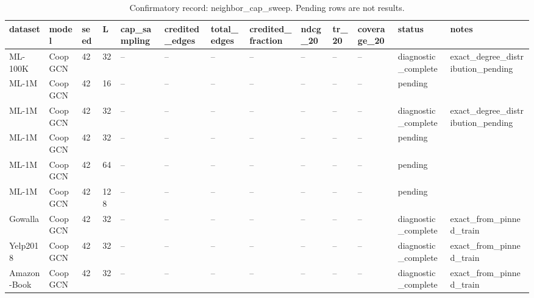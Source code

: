 \begin{table}[t]
\centering
\caption{Confirmatory record: neighbor\_cap\_sweep. Pending rows are not results.}
\begin{tabular}{lllllllllllll}
\toprule
\textbf{dataset} & \textbf{model} & \textbf{seed} & \textbf{L} & \textbf{cap\_sampling} & \textbf{credited\_edges} & \textbf{total\_edges} & \textbf{credited\_fraction} & \textbf{ndcg\_20} & \textbf{tr\_20} & \textbf{coverage\_20} & \textbf{status} & \textbf{notes} \\
\midrule
ML-100K & CoopGCN & 42 & 32 & -- & -- & -- & -- & -- & -- & -- & diagnostic\_complete & exact\_degree\_distribution\_pending \\
ML-1M & CoopGCN & 42 & 16 & -- & -- & -- & -- & -- & -- & -- & pending &  \\
ML-1M & CoopGCN & 42 & 32 & -- & -- & -- & -- & -- & -- & -- & diagnostic\_complete & exact\_degree\_distribution\_pending \\
ML-1M & CoopGCN & 42 & 32 & -- & -- & -- & -- & -- & -- & -- & pending &  \\
ML-1M & CoopGCN & 42 & 64 & -- & -- & -- & -- & -- & -- & -- & pending &  \\
ML-1M & CoopGCN & 42 & 128 & -- & -- & -- & -- & -- & -- & -- & pending &  \\
Gowalla & CoopGCN & 42 & 32 & -- & -- & -- & -- & -- & -- & -- & diagnostic\_complete & exact\_from\_pinned\_train \\
Yelp2018 & CoopGCN & 42 & 32 & -- & -- & -- & -- & -- & -- & -- & diagnostic\_complete & exact\_from\_pinned\_train \\
Amazon-Book & CoopGCN & 42 & 32 & -- & -- & -- & -- & -- & -- & -- & diagnostic\_complete & exact\_from\_pinned\_train \\
\bottomrule
\end{tabular}
\end{table}
